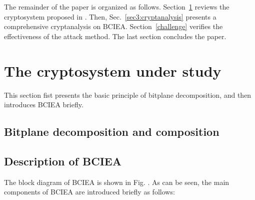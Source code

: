 \documentclass[final,3p,times]{elsarticle}
\begin{document}
%	
%	
%	
%

The remainder of the paper is organized as follows. Section~\ref{sec2:BCIEA} reviews the cryptosystem proposed in \cite{ESSAID2019jisa}. Then, Sec.~\ref{sec3:cryptanalysis} presents a comprehensive cryptanalysis on BCIEA. Section~\ref{challenge} verifies the effectiveness of the attack method. The last section concludes the paper.

\section{The cryptosystem under study}
\label{sec2:BCIEA}

This section fist presents the basic principle of bitplane decomposition, and then introduces BCIEA briefly.
\subsection{Bitplane decomposition and composition}


\subsection{Description of BCIEA}

The block diagram of BCIEA is shown in Fig. . As can be seen, the main components of BCIEA are introduced briefly as follows:

\end{document}
